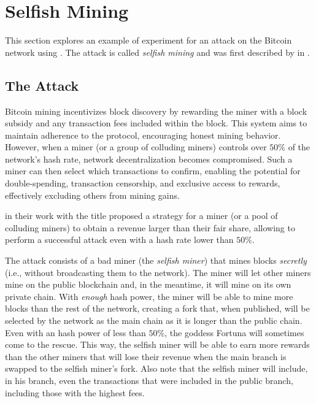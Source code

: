 \section{Selfish Mining}\label{sec:selfish-poc}

This section explores an example of experiment for an attack on the Bitcoin
network using \iblock{}. The attack is called \emph{selfish mining} and was
first described by \citeauthor{selfish-mining} in \citeyear{selfish-mining}
\cite{selfish-mining}.

\subsection{The Attack}\label{subsec:selfish-attack}

Bitcoin mining incentivizes block discovery by rewarding the miner with a block
subsidy and any transaction fees included within the block. This system aims to
maintain adherence to the protocol, encouraging honest mining behavior.
However, when a miner (or a group of colluding miners) controls over \(50\%\)
of the network's hash rate, network decentralization becomes compromised. Such
a miner can then select which transactions to confirm, enabling the potential
for double-spending, transaction censorship, and exclusive access to rewards,
effectively excluding others from mining gains.

\citeauthor{selfish-mining} in their work with the title
 proposed a strategy for a miner (or a pool of
colluding miners) to obtain a revenue larger than their fair share, allowing to
perform a successful attack even with a hash rate lower than \(50\%\).

The attack consists of a bad miner (the \emph{selfish miner}) that mines blocks
\emph{secretly} (i.e., without broadcasting them to the network). The miner
will let other miners mine on the public blockchain and, in the meantime, it
will mine on its own private chain. With \emph{enough} hash power, the miner
will be able to mine more blocks than the rest of the network, creating a fork
that, when published, will be selected by the network as the main chain as it
is longer than the public chain. Even with an hash power of less than \(50\%\),
the goddess Fortuna will sometimes come to the rescue. This way, the selfish
miner will be able to earn more rewards than the other miners that will lose
their revenue when the main branch is swapped to the selfish miner's fork. Also
note that the selfish miner will include, in his branch, even the transactions
that were included in the public branch, including those with the highest fees.


